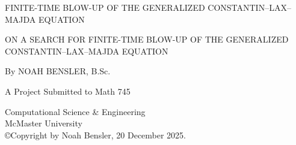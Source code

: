 \documentclass[12pt]{article}
\numberwithin{equation}{section}
\begin{document}
\begin{titlepage}
   \begin{center}
       \vspace*{1cm}

	    FINITE-TIME BLOW-UP OF THE GENERALIZED CONSTANTIN–LAX–MAJDA EQUATION
	   
   \end{center}
\end{titlepage}

\setcounter{page}{0}
\begin{titlepage}
   \begin{center}
       \vspace*{3.8cm}

       ON A SEARCH FOR FINITE-TIME BLOW-UP OF THE GENERALIZED CONSTANTIN–LAX–MAJDA EQUATION

       \vspace{2.5cm}

       By NOAH BENSLER, B.Sc.

       \vfill
            
       A Project Submitted to Math 745\\
            
       \vspace{0.8cm}
     
            
       Computational Science \& Engineering\\
       McMaster University\\
       ©Copyright by Noah Bensler, 20 December 2025.
            
   \end{center}
\end{titlepage}
\restoregeometry

\setcounter{page}{2}

\pagebreak
\end{document}
